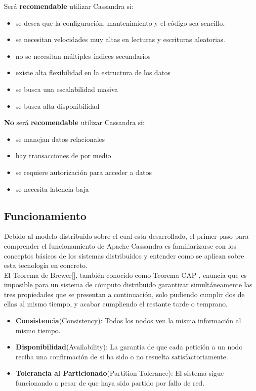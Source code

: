 Será \textbf{recomendable} utilizar Cassandra si:

\begin{itemize}
	\item se desea que la configuración, mantenimiento y el código sea sencillo.
	\item se necesitan velocidades muy altas en lecturas y escrituras aleatorias.
	\item no se necesitan múltiples índices secundarios
	\item existe alta flexibilidad en la estructura de los datos
	\item se busca una escalabilidad masiva
	\item se busca alta disponibilidad
\end{itemize}

\textbf{No} será \textbf{recomendable} utilizar Cassandra si:

\begin{itemize}
	\item se manejan datos relacionales
	\item hay transacciones de por medio
	\item se requiere autorización para acceder a datos
	\item se necesita latencia baja
\end{itemize}

\subsection{Funcionamiento}

Debido al modelo distribuido sobre el cual esta desarrollado, el primer paso para comprender el funcionamiento de Apache Cassandra es familiarizarse con los conceptos básicos de los sistemas distribuidos y entender como se aplican sobre esta tecnología en concreto.\\

El Teorema de Brewer[], también conocido como Teorema CAP , enuncia que es imposible para un sistema de cómputo distribuido garantizar simultáneamente las tres propiedades que se presentan a continuación, solo pudiendo cumplir dos de ellas al mismo tiempo, y acabar cumpliendo el restante tarde o temprano.\\

\begin{itemize}
	\item \textbf{Consistencia}(Consistency): Todos los nodos ven la misma información al mismo tiempo.
	\item \textbf{Disponibilidad}(Availability): La garantía de que cada petición a un nodo reciba una confirmación de si ha sido o no resuelta satisfactoriamente.
	\item \textbf{Tolerancia al Particionado}(Partition Tolerance): El sistema sigue funcionando a pesar de que haya sido partido por fallo de red.
\end{itemize}

